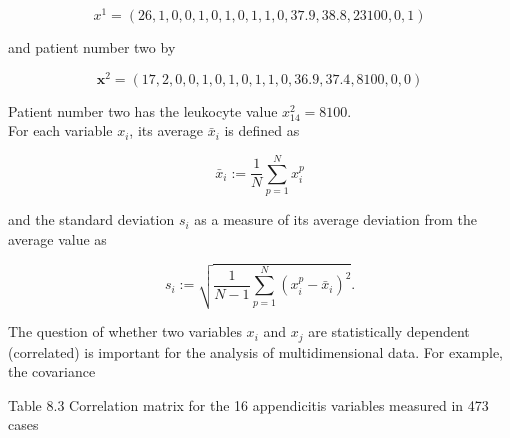 \documentclass[10pt]{article}
\begin{document}
$$
x^{1}=(26,1,0,0,1,0,1,0,1,1,0,37.9,38.8,23100,0,1)
$$

and patient number two by

$$
\boldsymbol{x}^{2}=(17,2,0,0,1,0,1,0,1,1,0,36.9,37.4,8100,0,0)
$$

Patient number two has the leukocyte value $x_{14}^{2}=8100$.\\
For each variable $x_{i}$, its average $\bar{x}_{i}$ is defined as

$$
\bar{x}_{i}:=\frac{1}{N} \sum_{p=1}^{N} x_{i}^{p}
$$

and the standard deviation $s_{i}$ as a measure of its average deviation from the average value as

$$
s_{i}:=\sqrt{\frac{1}{N-1} \sum_{p=1}^{N}\left(x_{i}^{p}-\bar{x}_{i}\right)^{2}} .
$$

The question of whether two variables $x_{i}$ and $x_{j}$ are statistically dependent (correlated) is important for the analysis of multidimensional data. For example, the covariance

Table 8.3 Correlation matrix for the 16 appendicitis variables measured in 473 cases
\end{document}
